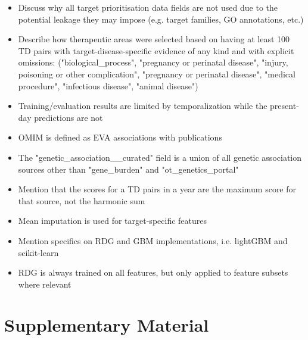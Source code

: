 \documentclass{article}
\begin{document}
\begin{itemize}
  \item Discuss why all target prioritisation data fields are not used due to the potential leakage they may impose (e.g. target families, GO annotations, etc.)
  \item Describe how therapeutic areas were selected based on having at least 100 TD pairs with target-disease-specific evidence of any kind and with explicit omissions: ("biological\_process", "pregnancy or perinatal disease", "injury, poisoning or other complication", "pregnancy or perinatal disease", "medical procedure", "infectious disease", "animal disease")
  \item Training/evaluation results are limited by temporalization while the present-day predictions are not
  \item OMIM is defined as EVA associations with publications
  \item The "genetic\_association\_\_curated" field is a union of all genetic association sources other than "gene\_burden" and "ot\_genetics\_portal"
  \item Mention that the scores for a TD pairs in a year are the maximum score for that source, not the harmonic sum
  \item Mean imputation is used for target-specific features
  \item Mention specifics on RDG and GBM implementations, i.e. lightGBM and scikit-learn
  \item RDG is always trained on all features, but only applied to feature subsets where relevant
\end{itemize} 

\section{Supplementary Material}






\end{document}
